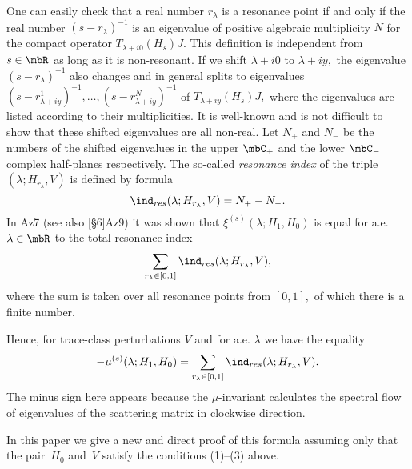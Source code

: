\documentclass[11pt]{amsart}
\numberwithin{equation}{section}
\begin{document}
One can easily check that a real number $r_\lambda$ is a resonance point if and only if the real number $(s-r_\lambda)^{-1}$ is an eigenvalue of positive algebraic multiplicity $N$ for the compact operator
$T_{\lambda+i0}(H_s)J.$ This definition is independent from $s \in \mbR$ as long as it is non-resonant.
If we shift $\lambda+i0$ to $\lambda+iy,$ the eigenvalue $(s-r_\lambda)^{-1}$ also changes and in general splits to eigenvalues
$(s-r^1_{\lambda+iy})^{-1},\ldots,(s-r^N_{\lambda+iy})^{-1}$ of $T_{\lambda+iy}(H_s)J,$ where the eigenvalues are listed according to their multiplicities.
It is well-known and is not difficult to show that these shifted eigenvalues are
all non-real. Let $N_+$ and $N_-$ be the numbers of the shifted eigenvalues in the upper $\mbC_+$ and the lower $\mbC_-$ complex half-planes respectively.
The so-called \emph{resonance index} of the triple $(\lambda; H_{r_\lambda},V)$ is defined by formula
$$
  \ind_{res}(\lambda; H_{r_\lambda},V) = N_+-N_-.
$$
In {\futurelet\NChar\CleverCite}{Az7} (see also {\futurelet\NChar\CleverCite}[\S 6]{Az9}) it was shown that ${\xi^{(s)}}(\lambda; H_1,H_0)$ is equal for a.e. $\lambda \in \mbR$ to the total resonance index
$$
  \sum_{r_\lambda \in [0,1]} \ind_{res}(\lambda; H_{r_\lambda},V),
$$
where the sum is taken over all resonance points from $[0,1],$ of which there is a finite number.

Hence, for trace-class perturbations $V$ and for a.e. $\lambda$ we have the equality
\begin{equation} \label{F: mus=sum ind(res)}
  - {\mu^{(s)}}(\lambda; H_1,H_0) = \sum_{r_\lambda \in [0,1]} \ind_{res}(\lambda; H_{r_\lambda},V).
\end{equation}
The minus sign here appears because the $\mu$-invariant calculates the spectral flow of eigenvalues of the scattering matrix in clockwise direction.

In this paper we give a new and direct proof of this formula
assuming only that the pair~$H_0$ and~$V$ satisfy the conditions
(1)--(3) above.
\end{document}

